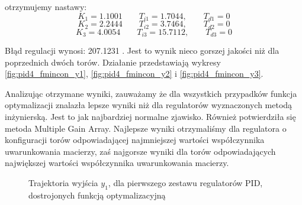 otrzymujemy nastawy:
\begin{equation}
  K_1 = \num{1.1001} \qquad T_{i1} = \num{1.7044}, \qquad T_{d1} = 0 \nonumber
\end{equation}
\begin{equation}
  K_2 = \num{2.2444} \qquad T_{i2} = \num{3.7464}, \qquad T_{d2} = 0
\end{equation}
\begin{equation}
  K_3 = \num{4.0054} \qquad T_{i3} = \num{15.7112}, \qquad T_{d3} = 0 \nonumber
\end{equation}

Błąd regulacji wynosi: \num{207.1231} .
Jest to wynik nieco gorszej jakości niż dla poprzednich dwóch torów.
Działanie
przedstawiają wykresy \ref{fig:pid4_fmincon_y1}, \ref{fig:pid4_fmincon_y2} i \ref{fig:pid4_fmincon_y3}.

Analizując otrzymane wyniki, zauważamy że dla wszystkich przypadków funkcja optymalizacji
znalazła lepsze wyniki niż dla regulatorów wyznaczonych metodą inżynierską. Jest to jak najbardziej normalne zjawisko.
Również potwierdziła się metoda Multiple Gain Array. Najlepsze wyniki otrzymaliśmy dla regulatora o konfiguracji
torów odpowiadającej najmniejszej wartości współczynnika uwarunkowania macierzy, zaś najgorsze wyniki
dla torów odpowiadających największej wartości współczynnika uwarunkowania macierzy.

\begin{figure}[b]
\centering
{}
\caption{Trajektoria wyjścia $y_1$, dla pierwszego zestawu regulatorów PID, dostrojonych funkcją optymalizacyjną}
\label{fig:pid1_fmincon_y1}
\end{figure}

